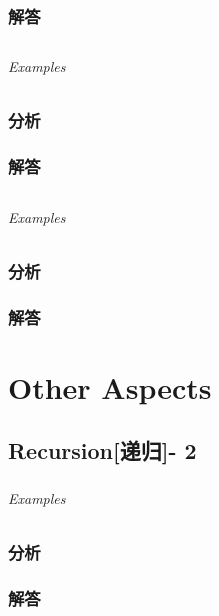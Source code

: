 \documentclass[UTF8,a4paper,12pt]{ctexbook}
\begin{document}
	\subsection{解答}
	
\section{}
	
	\subparagraph{Examples}
	
	\subsection{分析}
	
	\subsection{解答}
	
\section{}
	
	\subparagraph{Examples}
	
	\subsection{分析}
	
	\subsection{解答}

\chapter{Other Aspects}
\section{Recursion[递归]- 2}	
	\subsection{}
	
	\subparagraph{Examples}
	
	\subsection{分析}
	
	\subsection{解答}
\end{document}
